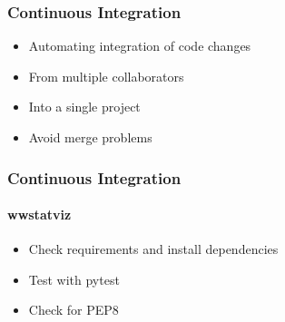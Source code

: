 \begin{frame}
    \frametitle{Continuous Integration}
    \begin{itemize}
        \item Automating integration of code changes
        \item From multiple collaborators
        \item Into a single project
        \item Avoid merge problems
    \end{itemize}
    
\end{frame}

\begin{frame}
    \frametitle{Continuous Integration}
    \framesubtitle{wwstatviz}
    
    \begin{itemize}
        \item Check requirements and install dependencies
        \item Test with pytest
        \item Check for PEP8
    \end{itemize}
\end{frame}
